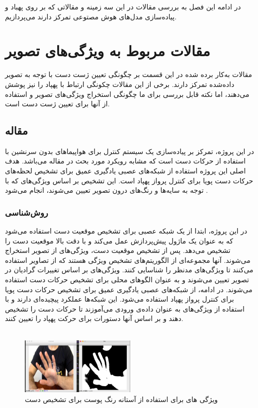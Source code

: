 در ادامه این فصل به بررسی مقالات در این سه زمینه و مقالاتی که بر روی پهباد و پیاده‌سازی مدل‌های هوش مصتوعی تمرکز دارند می‌پردازیم.

\section{مقالات مربوط به ویژگی‌های تصویر}
مقالات به‌کار برده شده در این قسمت بر چگونگی تعیین ژست دست با توجه به تصویر داده‌شده تمرکز دارند. برخی از این مقالات چکونگی ارتباط با پهپاد را نیز پوشش می‌دهند، اما نکته قابل بررسی برای ما چگونگی استخراج ویژگی‌های تصویر و استفاده از آنها برای تعیین ژست دست است.


\subsection{مقاله }
در این پروژه، تمرکز بر پیاده‌سازی یک سیستم کنترل برای هواپیماهای بدون سرنشین با استفاده از حرکات دست است که مشابه رویکرد مورد بحث در مقاله می‌باشد.
هدف اصلی این پروژه استفاده از شبکه‌های عصبی یادگیری عمیق برای تشخیص لحظه‌های حرکات دست پویا برای کنترل پرواز پهپاد 
است. این تشخیص بر اساس ویژگی‌های  که با توجه به سایه‌ها و رنگ‌های درون تصویر تعیین می‌شوند، انجام می‌شود \cite{natarajan2018hand}.

\subsubsection{روش‌شناسی}
در این پروژه، ابتدا از یک شبکه عصبی برای تشخیص موقعیت دست استفاده می‌شود که به عنوان یک ماژول پیش‌پردازش عمل می‌کند و با دقت بالا موقعیت دست را تشخیص می‌دهد. پس از تشخیص 
موقعیت دست، ویژگی‌های  از تصویر استخراج می‌شوند. آنها مجموعه‌ای از الگوریتم‌های تشخیص ویژگی هستند که از تصاویر استفاده می‌کنند تا ویژگی‌های مدنظر را 
شناسایی کنند. ویژگی‌های  بر اساس تغییرات گرادیان در تصویر تعیین می‌شوند و به عنوان الگوهای محلی برای تشخیص حرکات دست استفاده می‌شوند. در ادامه، از شبکه‌های عصبی یادگیری 
عمیق برای تشخیص حرکات دست پویا برای کنترل پرواز پهپاد استفاده می‌شود. این شبکه‌ها عملکرد پیچیده‌ای دارند و با استفاده از ویژگی‌های  به عنوان داده‌ی ورودی می‌آموزند تا حرکات دست را 
تشخیص دهند و بر اساس آنها دستورات برای حرکت پهپاد را تعیین کنند.
\\
\\
\begin{figure}[h]
    \centering
    \includegraphics[width=0.5\textwidth]{Haar3.png}
    \caption{ ویژگی های  برای استفاده از آستانه رنگ پوست برای تشخیص دست}
\end{figure}

